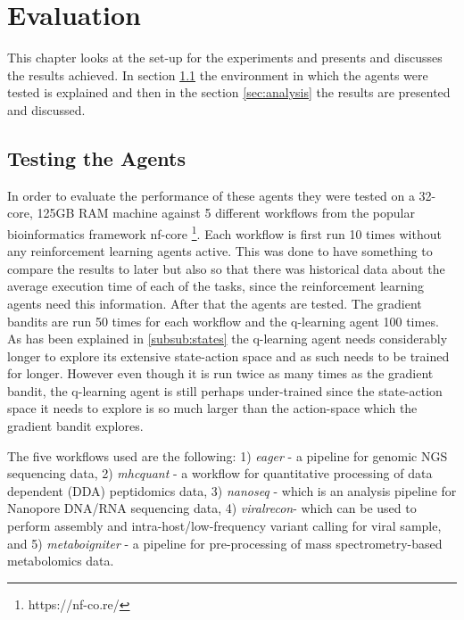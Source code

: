 
\cleardoublepage
\chapter{Evaluation}
\label{cha:evaluation}

This chapter looks at the set-up for the experiments and presents and discusses the results achieved. In section \ref{sec:testing} the environment in which the agents were tested is explained and then in the section \ref{sec:analysis} the results are presented and discussed. 

\section{Testing the Agents}
\label{sec:testing}

In order to evaluate the performance of these agents they were tested on a 32-core, 125GB RAM machine against 5 different workflows from the popular bioinformatics framework nf-core \footnote{https://nf-co.re/}. Each workflow is first run 10 times without any reinforcement learning agents active. This was done to have something to compare the results to later but also so that there was historical data about the average execution time of each of the tasks, since the reinforcement learning agents need this information. After that the agents are tested. The gradient bandits are run 50 times for each workflow and the q-learning agent 100 times. As has been explained in \ref{subsub:states} the q-learning agent needs considerably longer to explore its extensive state-action space and as such needs to be trained for longer. However even though it is run twice as many times as the gradient bandit, the q-learning agent is still perhaps under-trained since the state-action space it needs to explore is so much larger than the action-space which the gradient bandit explores.

The five workflows used are the following: 1) \textit{eager} - a pipeline for genomic NGS sequencing data, 2) \textit{mhcquant} - a workflow for quantitative processing of data dependent (DDA) peptidomics data, 3) \textit{nanoseq} - which is an analysis pipeline for Nanopore DNA/RNA sequencing data, 4) \textit{viralrecon}- which can be  used to perform assembly and intra-host/low-frequency variant calling for viral sample, and 5)  \textit{metaboigniter} - a pipeline for pre-processing of mass spectrometry-based metabolomics data. 

